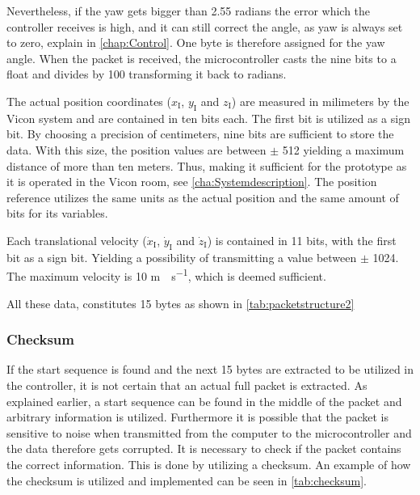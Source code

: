 Nevertheless, if the yaw gets bigger than 2.55 radians the error which the controller receives is high, and it can still correct the angle, as yaw is always set to zero, explain in \autoref{chap:Control}. One byte is therefore assigned for the yaw angle. When the packet is received, the microcontroller casts the nine bits to a float and divides by 100 transforming it back to radians.

The actual position coordinates ($x_{\mathrm{I}}$, $y_{\mathrm{I}}$ and $z_{\mathrm{I}}$) are measured in milimeters by the Vicon system and are contained in ten bits each. The first bit is utilized as a sign bit. By choosing a precision of centimeters, nine bits are sufficient to store the data. With this size, the position values are between $\pm$ 512 yielding a maximum distance of more than ten meters. Thus, making it sufficient for the prototype as it is operated in the Vicon room, see \autoref{cha:Systemdescription}. The position reference utilizes the same units as the actual position and the same amount of bits for its variables.

Each translational velocity ($\dot{x}_{\mathrm{I}}$, $\dot{y}_{\mathrm{I}}$ and $\dot{z}_{\mathrm{I}}$) is contained in 11 bits, with the first bit as a sign bit. Yielding a possibility of transmitting a value between $\pm$ 1024. The maximum velocity is 10 \si{m \cdot s^{-1}}, which is deemed sufficient.

All these data, constitutes 15 bytes as shown in \autoref{tab:packetstructure2}

\subsubsection{Checksum}
If the start sequence is found and the next 15 bytes are extracted to be utilized in the controller, it is not certain that an actual full packet is extracted. As explained earlier, a start sequence can be found in the middle of the packet and arbitrary information is utilized. Furthermore it is possible that the packet is sensitive to noise when transmitted from the computer to the microcontroller and the data therefore gets corrupted. It is necessary to check if the packet contains the correct information. This is done by utilizing a checksum. An example of how the checksum is utilized and implemented can be seen in \autoref{tab:checksum}.  

